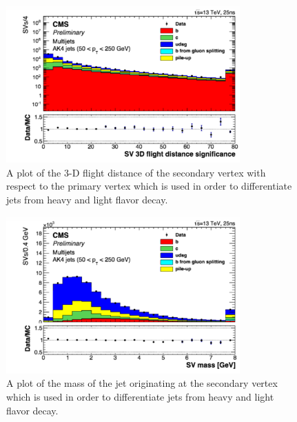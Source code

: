 \begin{figure}[!ht]
  \begin{center}
      \includegraphics[width=0.8\textwidth]{evtsel/figs/CMS-PAS-BTV-15-001_Figure_002-a.pdf}
    \caption{
      \label{fig:3dflightdistance}
      A plot of the 3-D flight distance of the secondary vertex with respect to the primary vertex
      which is used in order to differentiate jets from heavy and light flavor decay.
    }
  \end{center}
\end{figure}

\begin{figure}[!ht]
  \begin{center}
      \includegraphics[width=0.8\textwidth]{evtsel/figs/CMS-PAS-BTV-15-001_Figure_002-d.pdf}
    \caption{
      \label{fig:svmass}
      A plot of the mass of the jet originating at the secondary vertex
      which is used in order to differentiate jets from heavy and light flavor decay.
    }
  \end{center}
\end{figure}

